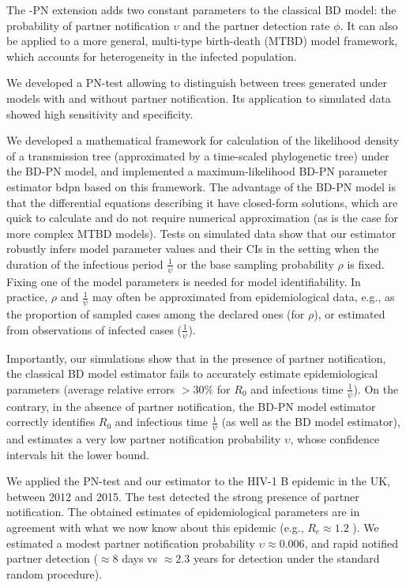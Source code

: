 \documentclass[a4paper,10pt]{article}
\begin{document}
The -PN extension adds two constant parameters to the classical BD model: the probability of partner notification $\upsilon$ and the partner detection rate $\phi$. It can also be applied to a more general, multi-type birth-death (MTBD) model framework, which accounts for heterogeneity in the infected population. 

We developed a PN-test allowing to distinguish between trees generated under models with and without partner notification. Its application to simulated data showed high sensitivity and specificity. 

We developed a mathematical framework for calculation of the likelihood density of a transmission tree (approximated by a time-scaled phylogenetic tree) under the BD-PN model, and implemented a maximum-likelihood BD-PN parameter estimator bdpn based on this framework. The advantage of the BD-PN model is that the differential equations describing it have closed-form solutions, which are quick to calculate and do not require numerical approximation (as is the case for more complex MTBD models). Tests on simulated data show that our estimator robustly infers model parameter values and their CIs in the setting when the duration of the infectious period $\frac{1}{\psi}$ or the base sampling probability $\rho$ is fixed. Fixing one of the model parameters is needed for model identifiability. In practice, $\rho$ and $\frac{1}{\psi}$ may often be approximated from epidemiological data, e.g., as the proportion of sampled cases among the declared ones (for $\rho$), or estimated from observations of infected cases ($\frac{1}{\psi}$). 

Importantly, our simulations show that in the presence of partner notification, the classical BD model estimator fails to accurately estimate epidemiological parameters (average relative errors $> 30\%$ for $R_0$ and infectious time $\frac{1}{\psi}$). On the contrary, in the absence of partner notification, the BD-PN model estimator correctly identifies $R_0$ and infectious time $\frac{1}{\psi}$ (as well as the BD model estimator), and estimates a very low partner notification probability $\upsilon$, whose confidence intervals hit the lower bound.

We applied the PN-test and our estimator to the HIV-1 B epidemic in the UK, between 2012 and 2015. The test detected the strong presence of partner notification. The obtained estimates of epidemiological parameters are in agreement with what we now know about this epidemic (e.g., $R_e \approx 1.2$ ). We estimated a modest partner notification probability $\upsilon \approx 0.006$, and rapid notified partner detection ($\approx 8$ days vs $\approx2.3$ years for detection under the standard random procedure).
\end{document}
